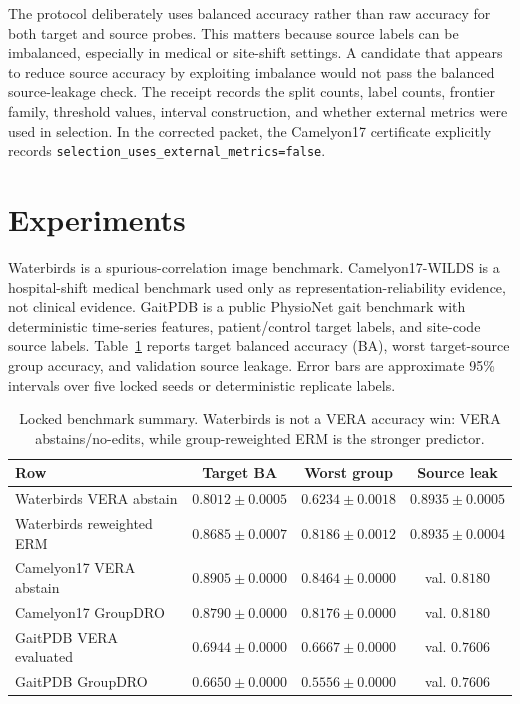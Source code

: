 \documentclass[letterpaper]{article}
\begin{document}
The protocol deliberately uses balanced accuracy rather than raw accuracy for
both target and source probes. This matters because source labels can be
imbalanced, especially in medical or site-shift settings. A candidate that
appears to reduce source accuracy by exploiting imbalance would not pass the
balanced source-leakage check. The receipt records the split counts, label
counts, frontier family, threshold values, interval construction, and whether
external metrics were used in selection. In the corrected packet, the
Camelyon17 certificate explicitly records
\texttt{selection\_uses\_external\_metrics=false}.

\section{Experiments}

Waterbirds is a spurious-correlation image benchmark. Camelyon17-WILDS is a
hospital-shift medical benchmark used only as representation-reliability
evidence, not clinical evidence. GaitPDB is a public PhysioNet gait benchmark
with deterministic time-series features, patient/control target labels, and
site-code source labels. Table~\ref{tab:main} reports target balanced accuracy
(BA), worst target-source group accuracy, and validation source leakage. Error
bars are approximate 95\% intervals over five locked seeds or deterministic
replicate labels.

\begin{table}[t]
\centering
\small
\caption{Locked benchmark summary. Waterbirds is not a VERA accuracy win:
VERA abstains/no-edits, while group-reweighted ERM is the stronger predictor.}
\label{tab:main}
\begin{tabular}{@{}lccc@{}}
\toprule
Row & Target BA & Worst group & Source leak \\
\midrule
Waterbirds VERA abstain & $0.8012{\pm}0.0005$ & $0.6234{\pm}0.0018$ & $0.8935{\pm}0.0005$ \\
Waterbirds reweighted ERM & $0.8685{\pm}0.0007$ & $0.8186{\pm}0.0012$ & $0.8935{\pm}0.0004$ \\
Camelyon17 VERA abstain & $0.8905{\pm}0.0000$ & $0.8464{\pm}0.0000$ & val. $0.8180$ \\
Camelyon17 GroupDRO & $0.8790{\pm}0.0000$ & $0.8176{\pm}0.0000$ & val. $0.8180$ \\
GaitPDB VERA evaluated & $0.6944{\pm}0.0000$ & $0.6667{\pm}0.0000$ & val. $0.7606$ \\
GaitPDB GroupDRO & $0.6650{\pm}0.0000$ & $0.5556{\pm}0.0000$ & val. $0.7606$ \\
\bottomrule
\end{tabular}
\end{table}
\end{document}
